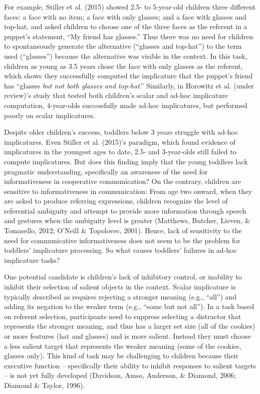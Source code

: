 \documentclass[a4paper,man,apacite,floatsintext]{apa6}
\begin{document}
For example, Stiller et al. (2015) showed 2.5- to 5-year-old children
three different faces: a face with no item; a face with only glasses;
and a face with glasses and top-hat, and asked children to choose one of
the three faces as the referent in a puppet's statement, ``My friend has
glasses.'' Thus there was no need for children to spontaneously generate
the alternative (``glasses and top-hat'') to the term used (``glasses'')
because the alternative was visible in the context. In this task,
children as young as 3.5 years chose the face with only glasses as the
referent, which shows they successfully computed the implicature that
the puppet's friend has ``glasses \emph{but not both glasses and
top-hat}.'' Similarly, in Horowitz et al. (under review)'s study that
tested both children's scalar and ad-hoc implicature computation,
4-year-olds successfully made ad-hoc implicatures, but performed poorly
on scalar implicatures.

Despite older children's success, toddlers below 3 years struggle with
ad-hoc implicatures. Even Stiller et al. (2015)'s paradigm, which found
evidence of implicatures in the youngest ages to date, 2.5- and
3-year-olds still failed to compute implicatures. But does this finding
imply that the young toddlers lack pragmatic understanding, specifically
an awareness of the need for informativeness in cooperative
communication? On the contrary, children are sensitive to
informativeness in communication: From age two onward, when they are
asked to produce referring expressions, children recognize the level of
referential ambiguity and attempt to provide more information through
speech and gestures when the ambiguity level is greater (Matthews,
Butcher, Lieven, \& Tomasello, 2012; O'Neill \& Topolovec, 2001). Hence,
lack of sensitivity to the need for communicative informativeness does
not seem to be the problem for toddlers' implicature processing. So what
causes toddlers' failures in ad-hoc implicature tasks?

One potential candidate is children's lack of inhibitory control, or
inability to inhibit their selection of salient objects in the context.
Scalar implicature is typically described as requires rejecting a
stronger meaning (e.g., ``all'') and adding its negation to the weaker
term (e.g., ``some but not all''). In a task based on referent
selection, participants need to suppress selecting a distractor that
represents the stronger meaning, and thus has a larger set size (all of
the cookies) or more features (hat and glasses) and is more salient.
Instead they must choose a less salient target that represents the
weaker meaning (some of the cookies, glasses only). This kind of task
may be challenging to children because their executive function --
specifically their ability to inhibit responses to salient targets -- is
not yet fully developed (Davidson, Amso, Anderson, \& Diamond, 2006;
Diamond \& Taylor, 1996).
\end{document}

